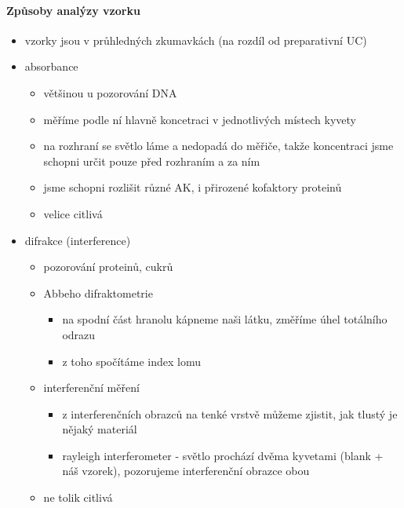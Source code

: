 \documentclass[DIV=8]{scrreprt}
\begin{document}
\paragraph{Způsoby analýzy vzorku}
\begin{itemize}[nosep]
    \item vzorky jsou v průhledných zkumavkách (na rozdíl od preparativní UC)
    \item absorbance
\begin{itemize}[nosep]
    \item většinou u pozorování DNA
    \item měříme podle ní hlavně koncetraci v jednotlivých místech kyvety
    \item na rozhraní se světlo láme a nedopadá do měřiče, takže koncentraci jsme schopni určit pouze před rozhraním a za ním
    \item jsme schopni rozlišit různé AK, i přirozené kofaktory proteinů
    \item velice citlivá
\end{itemize}

    \item difrakce (interference)
\begin{itemize}[nosep]
    \item pozorování proteinů, cukrů
    \item Abbeho difraktometrie
\begin{itemize}[nosep]
    \item na spodní část hranolu kápneme naši látku, změříme úhel totálního odrazu
    \item z toho spočítáme index lomu
\end{itemize}

    \item interferenční měření
\begin{itemize}[nosep]
    \item z interferenčních obrazců na tenké vrstvě můžeme zjistit, jak tlustý je nějaký materiál
    \item rayleigh interferometer - světlo prochází dvěma kyvetami (blank + náš vzorek), pozorujeme interferenční obrazce obou
\end{itemize}

    \item ne tolik citlivá
\end{itemize}

\end{itemize}
\end{document}

